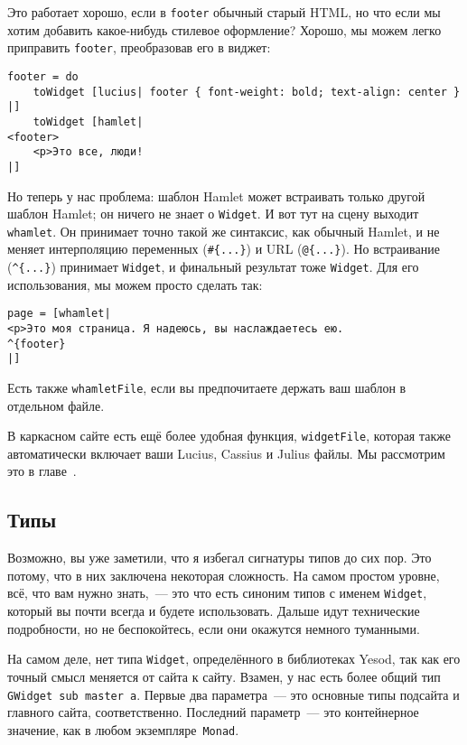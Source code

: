 Это работает хорошо, если в \lstinline'footer' обычный старый HTML, но что если
мы хотим добавить какое-нибудь стилевое оформление? Хорошо, мы можем легко
приправить \lstinline'footer', преобразовав его в виджет:
\begin{lstlisting}
footer = do
    toWidget [lucius| footer { font-weight: bold; text-align: center } |]
    toWidget [hamlet|
<footer>
    <p>Это все, люди!
|]
\end{lstlisting}

Но теперь у нас проблема: шаблон Hamlet может встраивать только другой шаблон
Hamlet; он ничего не знает о \lstinline'Widget'. И вот тут на сцену выходит
\lstinline'whamlet'. Он принимает точно такой же синтаксис, как обычный Hamlet,
и не меняет интерполяцию переменных (\lstinline'#{...}')  и URL
(\lstinline'@{...}'). Но встраивание (\lstinline'^{...}') принимает
\lstinline'Widget', и финальный результат тоже \lstinline'Widget'. Для его
использования, мы можем просто сделать так:
\begin{lstlisting}
page = [whamlet|
<p>Это моя страница. Я надеюсь, вы наслаждаетесь ею.
^{footer}
|]
\end{lstlisting}

Есть также \lstinline'whamletFile', если вы предпочитаете держать ваш шаблон в
отдельном файле.

\begin{remark}
    В каркасном сайте есть ещё более удобная функция, \lstinline'widgetFile',
    которая также автоматически включает ваши Lucius, Cassius и Julius файлы.
    Мы рассмотрим это в главе~.
\end{remark}

\subsection{Типы}
Возможно, вы уже заметили, что я избегал сигнатуры типов до сих пор. Это
потому, что в них заключена некоторая сложность. На самом простом уровне, всё,
что вам нужно знать,~--- это что есть синоним типов с именем
\lstinline'Widget', который вы почти всегда и будете использовать. Дальше идут
технические подробности, но не беспокойтесь, если они окажутся немного
туманными.

На самом деле, нет типа \lstinline'Widget', определённого в библиотеках Yesod,
так как его точный смысл меняется от сайта к сайту. Взамен, у нас есть более
общий тип \lstinline'GWidget sub master a'. Первые два параметра~--- это
основные типы подсайта и главного сайта, соответственно. Последний параметр~---
это контейнерное значение, как в любом экземпляре~\lstinline'Monad'.

